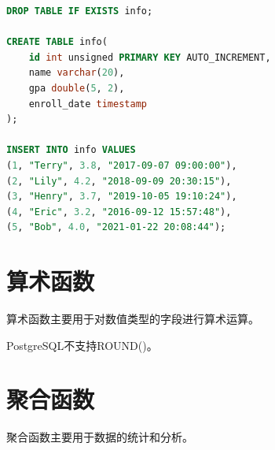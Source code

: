 \documentclass[12pt, openany, oneside]{book}
\begin{document}

\begin{lstlisting}[language=SQL]
DROP TABLE IF EXISTS info;

CREATE TABLE info(
    id int unsigned PRIMARY KEY AUTO_INCREMENT,
    name varchar(20),
    gpa double(5, 2),
    enroll_date timestamp
);

INSERT INTO info VALUES
(1, "Terry", 3.8, "2017-09-07 09:00:00"),
(2, "Lily", 4.2, "2018-09-09 20:30:15"),
(3, "Henry", 3.7, "2019-10-05 19:10:24"),
(4, "Eric", 3.2, "2016-09-12 15:57:48"),
(5, "Bob", 4.0, "2021-01-22 20:08:44");
\end{lstlisting}

\section{算术函数}

算术函数主要用于对数值类型的字段进行算术运算。

\begin{table}[H]
    \centering
    \caption{算术函数}
\end{table}

PostgreSQL不支持ROUND()。

\section{聚合函数}

聚合函数主要用于数据的统计和分析。

\begin{table}[H]
    \centering
    \caption{聚合函数}
\end{table}
\end{document}

